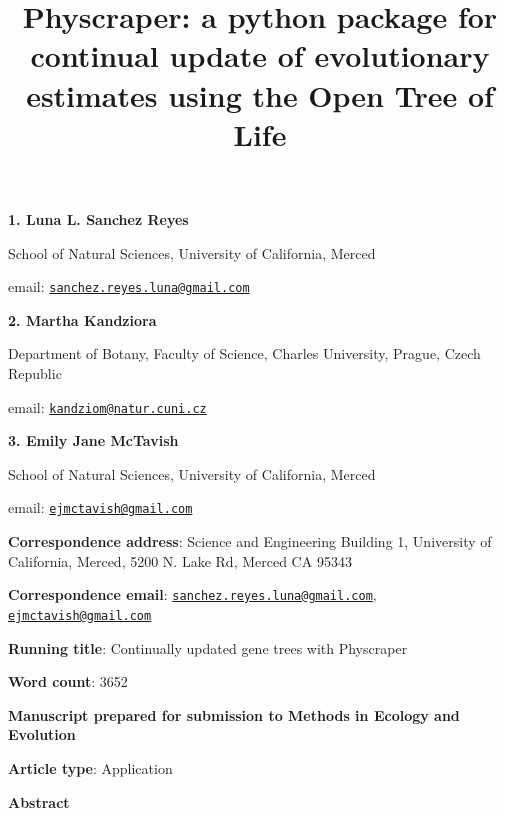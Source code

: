 \documentclass[]{article}
\title{Physcraper: a python package for continual update of evolutionary estimates using the Open Tree of Life}
\author{}
\date{\vspace{-2.5em}}
\begin{document}
\maketitle

\textbf{1. Luna L. Sanchez Reyes}

School of Natural Sciences, University of California, Merced

email: \href{mailto:sanchez.reyes.luna@gmail.com}{\nolinkurl{sanchez.reyes.luna@gmail.com}}

\textbf{2. Martha Kandziora}

Department of Botany, Faculty of Science, Charles University, Prague, Czech Republic

email: \href{mailto:kandziom@natur.cuni.cz}{\nolinkurl{kandziom@natur.cuni.cz}}

\textbf{3. Emily Jane McTavish}

School of Natural Sciences, University of California, Merced

email: \href{mailto:ejmctavish@gmail.com}{\nolinkurl{ejmctavish@gmail.com}}

\textbf{Correspondence address}: Science and Engineering Building 1, University of California, Merced, 5200 N. Lake Rd, Merced CA 95343

\textbf{Correspondence email}: \href{mailto:sanchez.reyes.luna@gmail.com}{\nolinkurl{sanchez.reyes.luna@gmail.com}}, \href{mailto:ejmctavish@gmail.com}{\nolinkurl{ejmctavish@gmail.com}}

\textbf{Running title}: Continually updated gene trees with Physcraper

\textbf{Word count}: 3652

\textbf{Manuscript prepared for submission to Methods in Ecology and Evolution}

\textbf{Article type}: Application

\newpage

\begingroup\Large

\textbf{Abstract}
\endgroup
\end{document}
